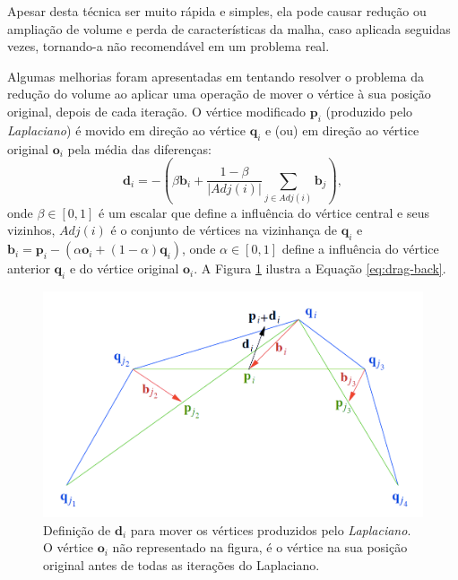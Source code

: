 Apesar desta técnica ser muito rápida e simples, ela pode causar redução ou ampliação de volume e perda de características da malha, caso aplicada seguidas vezes, tornando-a não recomendável em um problema real.


Algumas melhorias foram apresentadas em \cite{vollmer1999improved} tentando resolver o problema da redução do volume ao aplicar uma operação de mover o vértice à sua posição original, depois de cada iteração. O vértice modificado $\mathbf{p}_i$ (produzido pelo \textit{Laplaciano}) é movido em direção ao vértice $\mathbf{q}_i$ e (ou) em direção ao vértice original $\mathbf{o}_i$ pela média das diferenças:
\begin{equation} \label{eq:drag-back}
    \mathbf{d}_i = -(\beta \mathbf{b}_i + \frac{1 - \beta}{|Adj(i)|} \sum_{j \in Adj(i)}{\mathbf{b}_j}),
\end{equation}
onde $\beta \in [0,1]$ é um escalar que define a influência do vértice central e seus vizinhos, $Adj(i)$ é o conjunto de vértices na vizinhança de $\mathbf{q}_i$ e $\mathbf{b}_i = \mathbf{p}_i - (\alpha \mathbf{o}_i + (1 - \alpha)\mathbf{q}_i)$, onde $\alpha \in [0,1]$ define a influência do vértice anterior $\mathbf{q}_i$ e do vértice original $\mathbf{o}_i$. A Figura \ref{fig:drag-back} ilustra a Equação \ref{eq:drag-back}.

\begin{figure}[!h]
\captionsetup{width=\linewidth}
\centering
\includegraphics[scale=0.2]{figuras/drag-back-op.png}
\caption{Definição de $\mathbf{d}_i$ para mover os vértices produzidos pelo \textit{Laplaciano}. O vértice $\mathbf{o}_i$ não representado na figura, é o vértice na sua posição original antes de todas as iterações do Laplaciano.}
\label{fig:drag-back}
\end{figure}

